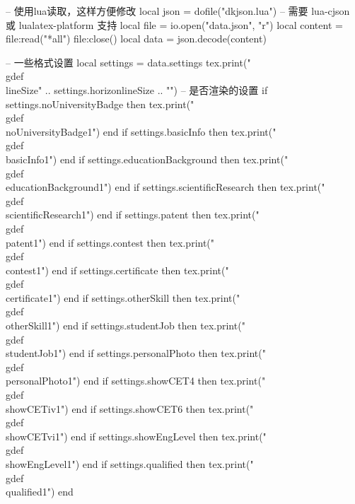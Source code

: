 \documentclass[10pt, a4paper, oneside]{ctexart}
\begin{document}
\setlength{\parindent}{0pt}

\begin{luacode}
-- 使用lua读取，这样方便修改
local json = dofile("dkjson.lua")  -- 需要 lua-cjson 或 lualatex-platform 支持
local file = io.open("data.json", "r")
local content = file:read("*all")
file:close()
local data = json.decode(content)

-- 一些格式设置
local settings = data.settings
tex.print("\\gdef\\lineSize{" .. settings.horizonlineSize .. "}")
-- 是否渲染的设置
if settings.noUniversityBadge then
    tex.print("\\gdef\\noUniversityBadge{1}")
end
if settings.basicInfo then
    tex.print("\\gdef\\basicInfo{1}")
end
if settings.educationBackground then
    tex.print("\\gdef\\educationBackground{1}")
end
if settings.scientificResearch then
    tex.print("\\gdef\\scientificResearch{1}")
end
if settings.patent then
    tex.print("\\gdef\\patent{1}")
end
if settings.contest then
    tex.print("\\gdef\\contest{1}")
end
if settings.certificate then
    tex.print("\\gdef\\certificate{1}")
end
if settings.otherSkill then
    tex.print("\\gdef\\otherSkill{1}")
end
if settings.studentJob then
    tex.print("\\gdef\\studentJob{1}")
end
if settings.personalPhoto then
    tex.print("\\gdef\\personalPhoto{1}")
end
if settings.showCET4 then
    tex.print("\\gdef\\showCETiv{1}")
end
if settings.showCET6 then
    tex.print("\\gdef\\showCETvi{1}")
end
if settings.showEngLevel then
    tex.print("\\gdef\\showEngLevel{1}")
end
if settings.qualified then
    tex.print("\\gdef\\qualified{1}")
end


\end{luacode}
\end{document}
